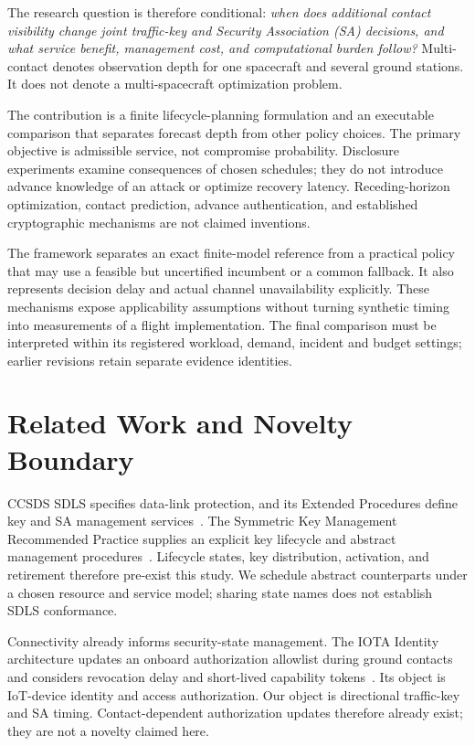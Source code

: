 \documentclass[conference]{IEEEtran}
\begin{document}
The research question is therefore conditional: \emph{when does additional contact visibility change joint traffic-key and Security Association (SA) decisions, and what service benefit, management cost, and computational burden follow?} Multi-contact denotes observation depth for one spacecraft and several ground stations. It does not denote a multi-spacecraft optimization problem.

The contribution is a finite lifecycle-planning formulation and an executable comparison that separates forecast depth from other policy choices. The primary objective is admissible service, not compromise probability. Disclosure experiments examine consequences of chosen schedules; they do not introduce advance knowledge of an attack or optimize recovery latency. Receding-horizon optimization, contact prediction, advance authentication, and established cryptographic mechanisms are not claimed inventions.

The framework separates an exact finite-model reference from a practical policy that may use a feasible but uncertified incumbent or a common fallback. It also represents decision delay and actual channel unavailability explicitly. These mechanisms expose applicability assumptions without turning synthetic timing into measurements of a flight implementation. The final comparison must be interpreted within its registered workload, demand, incident and budget settings; earlier revisions retain separate evidence identities.

\section{Related Work and Novelty Boundary}
CCSDS SDLS specifies data-link protection, and its Extended Procedures define key and SA management services~\cite{sdls,ep}. The Symmetric Key Management Recommended Practice supplies an explicit key lifecycle and abstract management procedures~\cite{skm}. Lifecycle states, key distribution, activation, and retirement therefore pre-exist this study. We schedule abstract counterparts under a chosen resource and service model; sharing state names does not establish SDLS conformance.

Connectivity already informs security-state management. The IOTA Identity architecture updates an onboard authorization allowlist during ground contacts and considers revocation delay and short-lived capability tokens~\cite{iota}. Its object is IoT-device identity and access authorization. Our object is directional traffic-key and SA timing. Contact-dependent authorization updates therefore already exist; they are not a novelty claimed here.
\end{document}
